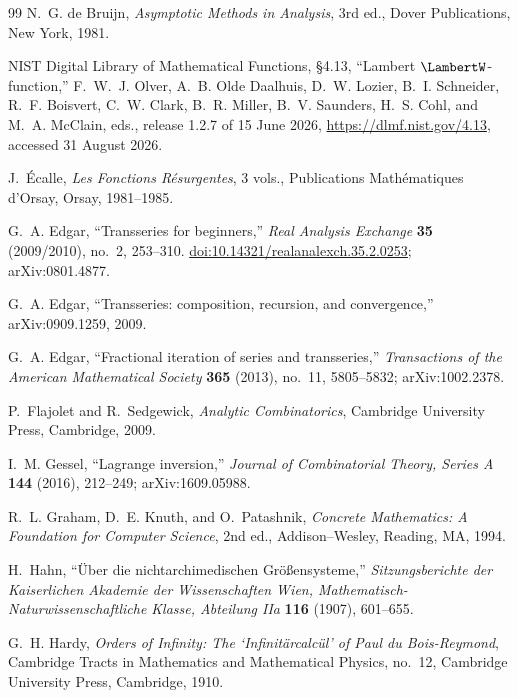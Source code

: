 \documentclass[11pt,oneside]{article}
\theoremstyle{plain}
\theoremstyle{definition}
\theoremstyle{remark}
\begin{document}
\begin{thebibliography}{99}
N.~G. de Bruijn,
\emph{Asymptotic Methods in Analysis}, 3rd ed.,
Dover Publications, New York, 1981.

NIST Digital Library of Mathematical Functions,
\S4.13, ``Lambert \(\LambertW\)-function,''
F.~W.~J. Olver, A.~B. Olde Daalhuis, D.~W. Lozier, B.~I. Schneider,
R.~F. Boisvert, C.~W. Clark, B.~R. Miller, B.~V. Saunders, H.~S. Cohl, and
M.~A. McClain, eds., release 1.2.7 of 15 June 2026,
\url{https://dlmf.nist.gov/4.13}, accessed 31 August 2026.

J.~\'Ecalle,
\emph{Les Fonctions R\'esurgentes}, 3 vols.,
Publications Math\'ematiques d'Orsay, Orsay, 1981--1985.

G.~A. Edgar,
``Transseries for beginners,''
\emph{Real Analysis Exchange} \textbf{35} (2009/2010), no.~2, 253--310.
\href{https://doi.org/10.14321/realanalexch.35.2.0253}{doi:10.14321/realanalexch.35.2.0253};
arXiv:0801.4877.

G.~A. Edgar,
``Transseries: composition, recursion, and convergence,''
arXiv:0909.1259, 2009.

G.~A. Edgar,
``Fractional iteration of series and transseries,''
\emph{Transactions of the American Mathematical Society} \textbf{365} (2013),
no.~11, 5805--5832;
arXiv:1002.2378.

P.~Flajolet and R.~Sedgewick,
\emph{Analytic Combinatorics},
Cambridge University Press, Cambridge, 2009.

I.~M. Gessel,
``Lagrange inversion,''
\emph{Journal of Combinatorial Theory, Series A} \textbf{144} (2016),
212--249;
arXiv:1609.05988.

R.~L. Graham, D.~E. Knuth, and O.~Patashnik,
\emph{Concrete Mathematics: A Foundation for Computer Science}, 2nd ed.,
Addison--Wesley, Reading, MA, 1994.

H.~Hahn,
``\"Uber die nichtarchimedischen Gr\"o\ss ensysteme,''
\emph{Sitzungsberichte der Kaiserlichen Akademie der Wissenschaften Wien,
Mathematisch-Naturwissenschaftliche Klasse, Abteilung IIa}
\textbf{116} (1907), 601--655.

G.~H. Hardy,
\emph{Orders of Infinity: The `Infinit\"arcalc\"ul' of Paul du Bois-Reymond},
Cambridge Tracts in Mathematics and Mathematical Physics, no.~12,
Cambridge University Press, Cambridge, 1910.


\end{thebibliography}
\end{document}
